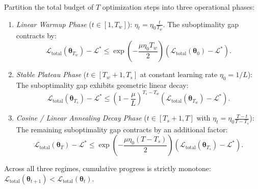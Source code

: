 \begin{corollary}
\label{cor:wsd_exact_convergence_phases}
Partition the total budget of $T$ optimization steps into three operational phases:
\begin{enumerate}
    \item \emph{Linear Warmup Phase} ($t \in [1, T_w]$): $\eta_t = \eta_0 \frac{t}{T_w}$. The suboptimality gap contracts by:
    \begin{equation}
    \mathcal{L}_{\text{total}}(\bm{\theta}_{T_w}) - \mathcal{L}^* \le \exp\left( -\frac{\mu \eta_0 T_w}{2} \right) (\mathcal{L}_{\text{total}}(\bm{\theta}_0) - \mathcal{L}^*).
    \label{eq:wsd_warmup_contraction}
    \end{equation}
    \item \emph{Stable Plateau Phase} ($t \in [T_w + 1, T_s]$ at constant learning rate $\eta_0 = 1/L$): The suboptimality gap exhibits geometric linear decay:
    \begin{equation}
    \mathcal{L}_{\text{total}}(\bm{\theta}_{T_s}) - \mathcal{L}^* \le \left( 1 - \frac{\mu}{L} \right)^{T_s - T_w} (\mathcal{L}_{\text{total}}(\bm{\theta}_{T_w}) - \mathcal{L}^*).
    \label{eq:wsd_stable_contraction}
    \end{equation}
    \item \emph{Cosine / Linear Annealing Decay Phase} ($t \in [T_s + 1, T]$ with $\eta_t = \eta_0 \frac{T - t}{T - T_s}$): The remaining suboptimality gap contracts by an additional factor:
    \begin{equation}
    \mathcal{L}_{\text{total}}(\bm{\theta}_T) - \mathcal{L}^* \le \exp\left( -\frac{\mu \eta_0 (T - T_s)}{2} \right) (\mathcal{L}_{\text{total}}(\bm{\theta}_{T_s}) - \mathcal{L}^*).
    \label{eq:wsd_decay_contraction}
    \end{equation}
\end{enumerate}
Across all three regimes, cumulative progress is strictly monotone: $\mathcal{L}_{\text{total}}(\bm{\theta}_{t+1}) < \mathcal{L}_{\text{total}}(\bm{\theta}_t)$.
\end{corollary}

